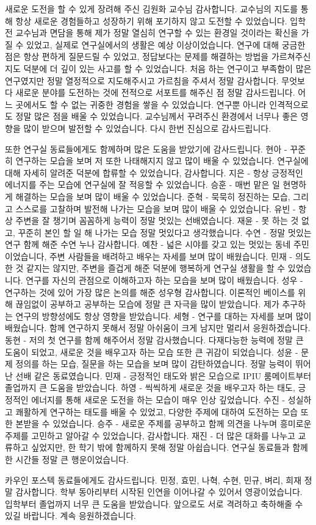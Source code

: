 새로운 도전을 할 수 있게 장려해 주신 김원화 교수님 감사합니다.
교수님의 지도를 통해 항상 새로운 경험들하고 성장하기 위해 포기하지 않고 도전할 수 있었습니다.
입학 전 교수님과 면담을 통해 제가 정말 열심히 연구할 수 있는 환경일 것이라는 확신을 가질 수 있었고,
실제로 연구실에서의 생활은 예상 이상이었습니다.
연구에 대해 궁금한 점은 항상 편하게 질문드릴 수 있었고,
정답보다는 문제를 해결하는 방법을 가르쳐주신 지도 덕분에 더 깊이 있는 사고를 할 수 있었습니다.
처음 하는 연구이고 부족함이 많은 연구였지만 정말 열정적으로 지도해주시고 가르침을 주셔서 정말 감사합니다.
무엇보다 새로운 분야를 도전하는 것에 전적으로 서포트를 해주신 점 정말 감사드립니다.
어느 곳에서도 할 수 없는 귀중한 경험을 쌓을 수 있었습니다.
연구뿐 아니라 인격적으로도 정말 많은 점을 배울 수 있었습니다.
교수님께서 꾸려주신 환경에서 너무나 좋은 영향을 많이 받으며 발전할 수 있었습니다.
다시 한번 진심으로 감사드립니다.

또한 연구실 동료들에게도 함께하며 많은 도움을 받았기에 감사드립니다.
현아 - 꾸준히 연구하는 모습을 보며 저 또한 나태해지지 않고 많이 배울 수 있었습니다. 연구실에 대해 자세히 알려준 덕분에 합류할 수 있었습니다, 감사합니다.
지은 - 항상 긍정적인 에너지를 주는 모습에 연구실에 잘 적응할 수 있었습니다.
승훈 - 매번 맡은 일 현명하게 해결하는 모습을 보며 많이 배울 수 있었습니다.
준혁 - 묵묵히 정진하는 모습, 그리고 스스로를 고찰하며 발전해 나가는 모습을 보며 많이 배울 수 있었습니다.
유빈 - 항상 주변을 잘 챙기며 꼼꼼하게 능력이 정말 멋있는 선배였습니다.
재윤 - 못 하는 것 없고, 꾸준히 본인 할 일 해 나가는 모습 정말 멋있다고 생각했습니다.
수연 - 정말 멋있는 연구 함께 해준 수연 누나 감사합니다.
예찬 - 넓은 시야를 갖고 있는 멋있는 동네 주민이었습니다, 주변 사람들을 배려하고 배우는 자세를 보며 많이 배웠습니다.
민재 - 의도한 것 같지는 않지만, 주변을 즐겁게 해준 덕분에 행복하게 연구실 생활을 할 수 있었습니다. 연구를 자신의 관점으로 이해하고자 하는 모습을 보며 많이 배웠습니다.
성우 - 연구하는 것에 있어 가장 많은 논의를 해준 성우형 감사합니다. 이론적인 베이스를 위해 끊임없이 공부하고 공부하는 모습에 정말 큰 자극을 많이 받았습니다. 제가 추구하는 연구의 방향성에도 항상 영향을 받았습니다.
세형 - 연구를 대하는 자세를 보며 많이 배웠습니다. 함께 연구하지 못해서 정말 아쉬움이 크게 남지만 멀리서 응원하겠습니다.
동현 - 저의 첫 연구를 함께 해주어서 정말 감사했습니다. 다재다능한 능력에 정말 큰 도움이 되었고, 새로운 것을 배우고자 하는 모습 또한 큰 귀감이 되었습니다.
성윤 - 문제 정의를 하는 모습, 질문을 하는 모습을 보며 많이 감탄하였습니다. 정말 능력이 뛰어난 선배 같은 동료였습니다.
민재 - 긍정적인 태도와 밝은 모습으로 IPIU 룸메이트부터 졸업까지 큰 도움을 받았습니다.
하영 - 씩씩하게 새로운 것을 배우고자 하는 태도, 긍정적인 에너지를 통해 새로운 도전을 하는 모습이 매우 인상 깊었습니다.
수진 - 성실하고 쾌활하게 연구하는 태도를 배울 수 있었고, 다양한 주제에 대하여 도전하는 모습 또한 본받을 수 있었습니다.
승주 - 새로운 주제를 공부하고 함께 의견을 나누며 흥미로운 주제를 고민하고 알아갈 수 있었습니다, 감사합니다.
재진 - 더 많은 대화를 나누고 교류하고 싶었지만, 한 학기 밖에 함께하지 못해 정말 아쉽습니다.
연구실 동료들과 함께한 시간들 정말 큰 행운이었습니다.

카우인 포스텍 동료들에게도 감사드립니다. 민정, 효민, 나혁, 수현, 민규, 벼리, 희재 정말 감사합니다.
학부 동아리부터 시작된 인연을 이어나갈 수 있어서 영광이었습니다.
입학부터 졸업까지 너무 큰 도움을 받았습니다.
앞으로도 서로 격려하고 축하해줄 수 있길 바랍니다. 계속 응원하겠습니다.
